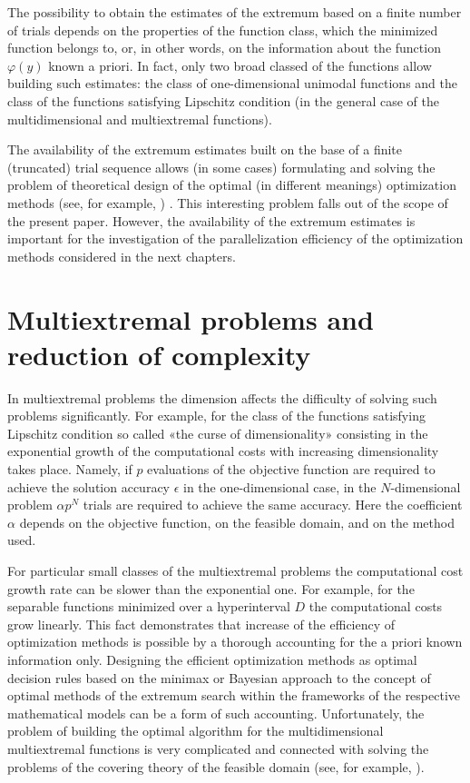 The possibility to obtain the estimates of the extremum based on a finite number of trials depends on the properties of the function class, which the minimized function belongs to, or, in other words, on the information about the function $\varphi(y)$ known a priori. In fact, only two broad classed of the functions allow building such estimates: the class of one-dimensional unimodal functions and the class of the functions satisfying Lipschitz condition (in the general case of the multidimensional and multiextremal functions).

The availability of the extremum estimates built on the base of a finite (truncated) trial sequence allows (in some cases) formulating and solving the problem of theoretical design of the optimal (in different meanings) optimization methods (see, for example, \cite{1_Kushner, 1_Mockus, 1_StrSergMon2000, 1_Sukharev1971, 1_Sukharev1972, 1_Sukharev1989}) . This interesting problem falls out of the scope of the present paper. However, the availability of the extremum estimates is important for the investigation of the parallelization efficiency of the optimization methods considered in the next chapters.

\section{Multiextremal problems and reduction of complexity}
\label{sec:3}
In multiextremal problems the dimension affects the difficulty of solving such problems significantly. For example, for the class of the functions satisfying Lipschitz condition so called «the curse of dimensionality» consisting in the exponential growth of the computational costs with increasing dimensionality takes place. Namely, if $p$ evaluations of the objective function are required to achieve the solution accuracy $\epsilon$ in the one-dimensional case, in the $N$-dimensional problem $\alpha p^N$  trials are required to achieve the same accuracy. Here the coefficient $\alpha$ depends on the objective function, on the feasible domain, and on the method used. 

For particular small classes of the multiextremal problems the computational cost growth rate can be slower than the exponential one. For example, for the separable functions minimized over a hyperinterval $D$ the computational costs grow linearly. This fact demonstrates that increase of the efficiency of optimization methods is possible by a thorough accounting for the a priori known information only. Designing the efficient optimization methods as optimal decision rules based on the minimax or Bayesian approach to the concept of optimal methods of the extremum search within the frameworks of the respective mathematical models can be a form of such accounting. Unfortunately, the problem of building the optimal algorithm for the multidimensional multiextremal functions is  very complicated and connected with solving the problems of the covering theory of the feasible domain (see, for example, \cite{1_Sukharev1971, 1_Sukharev1972, 1_Sukharev1989}).

